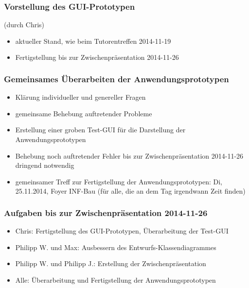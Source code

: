 \documentclass[12pt,a4paper]{article}
\begin{document}
\subsubsection*{Vorstellung des GUI-Prototypen}
(durch Chris)
\begin{itemize}
\item aktueller Stand, wie beim Tutorentreffen 2014-11-19
\item Fertigstellung bis zur Zwischenpräsentation 2014-11-26
\end{itemize}

\subsubsection*{Gemeinsames Überarbeiten der Anwendungsprototypen}
\begin{itemize}
\item Klärung individueller und genereller Fragen
\item gemeinsame Behebung auftretender Probleme
\item Erstellung einer groben Test-GUI für die Darstellung der Anwendungsprototypen
\item Behebung noch auftretender Fehler bis zur Zwischenpräsentation 2014-11-26 dringend notwendig
\item gemeinsamer Treff zur Fertigstellung der Anwendungsprototypen: Di, 25.11.2014, Foyer INF-Bau (für alle, die an dem Tag irgendwann Zeit finden)
\end{itemize}

\subsubsection*{Aufgaben bis zur Zwischenpräsentation 2014-11-26}
\begin{itemize}
\item Chris: Fertigstellung des GUI-Prototypen, Überarbeitung der Test-GUI
\item Philipp W. und Max: Ausbessern des Entwurfs-Klassendiagrammes
\item Philipp W. und Philipp J.: Erstellung der Zwischenpräsentation
\item Alle: Überarbeitung und Fertigstellung der Anwendungsprototypen
\end{itemize}
\end{document}
